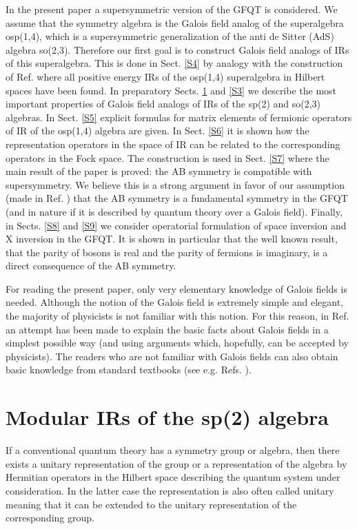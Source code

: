 \documentclass[a4paper,12pt]{article}%
\begin{document}
In the present paper a supersymmetric version
of the GFQT is considered. We assume that the symmetry 
algebra is the 
Galois field analog of the superalgebra osp(1,4), which is 
a supersymmetric generalization of the anti de Sitter (AdS) 
algebra so(2,3). Therefore our first goal is to construct
Galois field analogs of IRs of this superalgebra. This is
done in Sect. \ref{S4} by analogy with the construction of
Ref. \cite{Heidenreich} where all 
positive energy IRs of the osp(1,4) superalgebra in Hilbert
spaces have been found. In preparatory Sects. \ref{S2}
and \ref{S3}
we describe the most important properties of Galois
field analogs of IRs of the sp(2) and so(2,3) algebras.
In Sect. \ref{S5} explicit formulas for matrix elements
of fermionic operators of IR of the osp(1,4) algebra are
given. In Sect. \ref{S6} it is shown how the representation
operators in the space of IR can be related to the 
corresponding operators in the Fock space. The construction
is used in Sect. \ref{S7} where the main result of the
paper is proved: the AB symmetry is compatible with
supersymmetry. We believe this is a strong argument in favor
of our assumption (made in Ref. \cite{lev2}) that the
AB symmetry is a fundamental symmetry in the GFQT (and in
nature if it is described by quantum theory over a
Galois field). Finally, in Sects. \ref{S8} and \ref{S9}
we consider
operatorial formulation of space inversion and X inversion
in the GFQT. It is shown in particular that the well
known result, that the parity of bosons is real and the
parity of fermions is imaginary, is a direct consequence
of the AB symmetry.

For reading the present paper, only very elementary 
knowledge of Galois fields is needed. Although the
notion of the Galois field is extremely simple and
elegant, the majority of physicists is not familiar with
this notion. For this reason, in Ref. \cite{lev2} an
attempt has been made to explain the basic facts about
Galois fields in a simplest possible way (and using
arguments which, hopefully, can be accepted by physicists). 
The readers who are not familiar with Galois fields can 
also obtain basic knowledge from standard textbooks
(see e.g. Refs. \cite{VDW}). 
 
\section{Modular IRs of the sp(2) algebra}
\label{S2}

If a conventional quantum theory has a symmetry group or
algebra, then there exists a unitary representation of 
the group or a representation of the algebra by Hermitian
operators in the Hilbert space describing the quantum 
system under consideration. In the latter case the
representation is also often called unitary meaning
that it can be extended to the unitary representation
of the corresponding group. 
\end{document}
